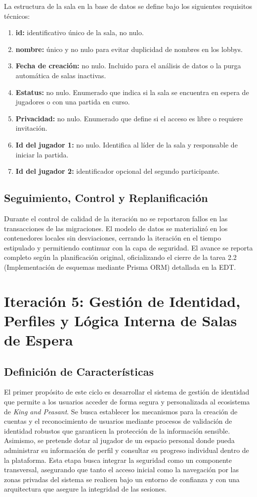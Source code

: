 La estructura de la sala en la base de datos se define bajo los siguientes requisitos técnicos:
\begin{enumerate}
    \item \textbf{id:} identificativo único de la sala, no nulo.
    \item \textbf{nombre:} único y no nulo para evitar duplicidad de nombres en los lobbys.
    \item \textbf{Fecha de creación:} no nulo. Incluido para el análisis de datos o la purga automática de salas inactivas.
    \item \textbf{Estatus:} no nulo. Enumerado que indica si la sala se encuentra en espera de jugadores o con una partida en curso.
    \item \textbf{Privacidad:} no nulo. Enumerado que define si el acceso es libre o requiere invitación.
    \item \textbf{Id del jugador 1:} no nulo. Identifica al líder de la sala y responsable de iniciar la partida.
    \item \textbf{Id del jugador 2:} identificador opcional del segundo participante.
\end{enumerate}

\section{Seguimiento, Control y Replanificación}
Durante el control de calidad de la iteración no se reportaron fallos en las transacciones de las migraciones. El modelo de datos se materializó en los contenedores locales sin desviaciones, cerrando la iteración en el tiempo estipulado y permitiendo continuar con la capa de seguridad. El avance se reporta completo según la planificación original, oficializando el cierre de la tarea 2.2 (Implementación de esquemas mediante Prisma ORM) detallada en la EDT.


\chapter[Iteración 5: Gestión de Identidad y Salas (Lobbies)]{Iteración 5: Gestión de Identidad, Perfiles y Lógica Interna de Salas de Espera}

\section{Definición de Características}
El primer propósito de este ciclo es desarrollar el sistema de gestión de identidad que permite a los usuarios acceder de forma segura y personalizada al ecosistema de \textit{King and Peasant}. Se busca establecer los mecanismos para la creación de cuentas y el reconocimiento de usuarios mediante procesos de validación de identidad robustos que garanticen la protección de la información sensible. Asimismo, se pretende dotar al jugador de un espacio personal donde pueda administrar su información de perfil y consultar su progreso individual dentro de la plataforma. Esta etapa busca integrar la seguridad como un componente transversal, asegurando que tanto el acceso inicial como la navegación por las zonas privadas del sistema se realicen bajo un entorno de confianza y con una arquitectura que asegure la integridad de las sesiones.

